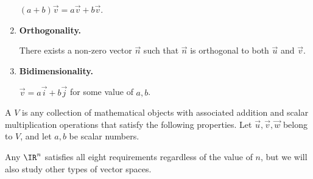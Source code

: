 \begin{applicationActivities}
\begin{activity}{20}
\begin{multicols}{2}
\begin{enumerate}
        \((a+b)\vec v=a\vec v+b\vec v\).
  \item \textbf{Orthogonality.}

        There exists a non-zero vector \(\vec n\) such that
        \(\vec n\) is orthogonal to both \(\vec u\) and \(\vec v\).
  \item \textbf{Bidimensionality.}

        \(\vec v=a\vec i+b\vec j\) for some value of \(a,b\).
\end{enumerate}
\end{multicols}
\end{activity}

\begin{definition}
  A  \(V\) is any collection of mathematical objects with
  associated addition and scalar multiplication operations that satisfy
  the following properties. Let \(\vec u,\vec v,\vec w\) belong to \(V\),
  and let \(a,b\) be scalar numbers.

  \vectorSpaceProperties

  Any  \(\IR^n\) satisfies all eight
  requirements regardless of the value of \(n\),
  but we will also study other types of vector spaces.
\end{definition}


\end{applicationActivities}
